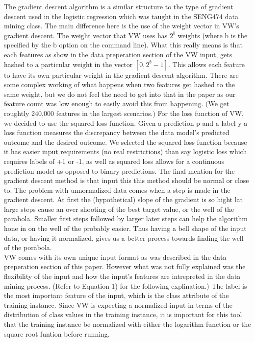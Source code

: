 The gradient descent algorithm is a similar structure to the type of gradient descent used in the logistic regression which was taught
in the SENG474 data mining class. The main difference here is the use of the weight vector in VW's gradient descent. The weight vector
that VW uses has $2^b$ weights (where b is the specified by the b option on the command line). What this really means is that each features
as show in the data preperation section of the VW input, gets hashed to a particular weight in the vector $[0, 2^b-1]$. This allows each
feature to have its own particular weight in the gradient descent algorithm. There are some complex working of what happens when two
features get hashed to the same weight, but we do not feel the need to get into that in the paper as our feature count was low enough
to easily avoid this from happening. (We get roughtly 240,000 features in the largest scenarios.) For the loss function of VW, we decided
to use the squared loss function. Given a prediction p and a label y a loss function measures the discrepancy between the data model's
predicted outcome and the desired outcome. We selected the squared loss function because it has easier input requirements (no real
restrictions) than say logistic loss which requires labels of +1 or -1, as well as squared loss allows for a continuous prediction model
as opposed to binary predictions. The final mention for the gradient descent method is that input this this method should be normal
or close to. The problem with unnormalized data comes when a step is made in the gradient descent. At first the (hypothetical) slope
of the gradient is so hight lat large steps cause an over shooting of the best target value, or the well of the parabola. Smaller
first steps followed by larger later steps can help the algorithm hone in on the well of the probably easier. Thus having a bell
shape of the input data, or having it normalized, gives us a better process towards finding the well of the porabola.\\

VW comes with its own unique input format as was described in the data preperation section of this paper. However what was not fully
explained was the flexibility of the input and how the input's features are intrepreted in the data mining process. (Refer to Equation 1)
for the following explination.) The label is the most important feature of the input, which is the class attribute of the training
instance. Since VW is expecting a normalized input in terms of the distribution of class values in the training instance, it is important
for this tool that the training instance be normalized with either the logarithm function or the square root funtion before running.\\

